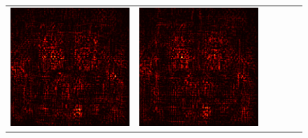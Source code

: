 \documentclass[preprint,12pt]{elsarticle}
\begin{document}
\begin{figure}[p]
\begin{tabular}{cccccc}
  \includegraphics[scale=\scale]{../visualizations/examples/imagenette/resnet18/positive_saliency_map/9.png} & 
  \includegraphics[scale=\scale]{../visualizations/examples/imagenette/resnet18/negative_saliency_map/9.png} & 

\end{tabular}
\end{figure}
\end{document}
